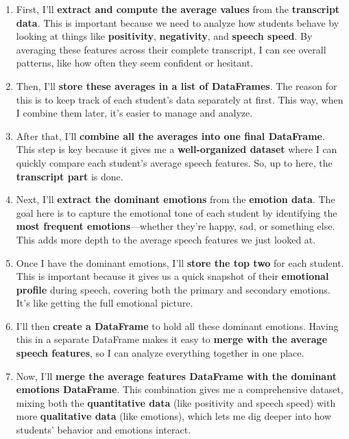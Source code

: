 \documentclass{article}
\newcommand{\highlight}[1]{\textsf{\textbf{#1}}}  %
\begin{document}
\begin{multicols}{2}

\begin{enumerate}
    \item First, I'll \highlight{extract and compute the average values} from the \highlight{transcript data}. This is important because we need to analyze how students behave by looking at things like \highlight{positivity}, \highlight{negativity}, and \highlight{speech speed}. By averaging these features across their complete transcript, I can see overall patterns, like how often they seem confident or hesitant.
    
    \item Then, I’ll \highlight{store these averages in a list of DataFrames}. The reason for this is to keep track of each student’s data separately at first. This way, when I combine them later, it’s easier to manage and analyze.
    
    \item After that, I’ll \highlight{combine all the averages into one final DataFrame}. This step is key because it gives me a \highlight{well-organized dataset} where I can quickly compare each student’s average speech features. So, up to here, the \highlight{transcript part} is done.
    
    \item Next, I’ll \highlight{extract the dominant emotions} from the \highlight{emotion data}. The goal here is to capture the emotional tone of each student by identifying the \highlight{most frequent emotions}—whether they're happy, sad, or something else. This adds more depth to the average speech features we just looked at.
    
    \item Once I have the dominant emotions, I’ll \highlight{store the top two} for each student. This is important because it gives us a quick snapshot of their \highlight{emotional profile} during speech, covering both the primary and secondary emotions. It’s like getting the full emotional picture.
    
    \item I’ll then \highlight{create a DataFrame} to hold all these dominant emotions. Having this in a separate DataFrame makes it easy to \highlight{merge with the average speech features}, so I can analyze everything together in one place.
    
    \item Now, I’ll \highlight{merge the average features DataFrame with the dominant emotions DataFrame}. This combination gives me a comprehensive dataset, mixing both the \highlight{quantitative data} (like positivity and speech speed) with more \highlight{qualitative data} (like emotions), which lets me dig deeper into how students' behavior and emotions interact.
    

\end{enumerate}
\end{multicols}
\end{document}
